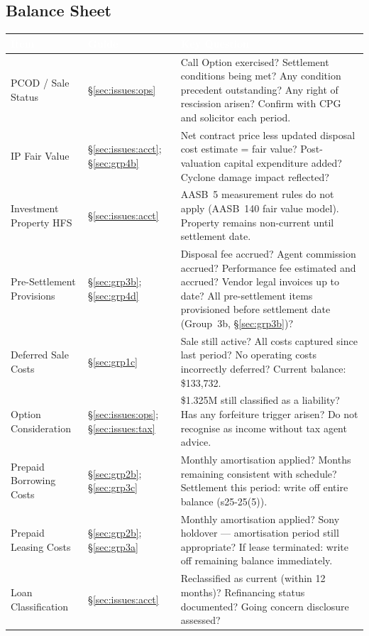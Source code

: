 \documentclass[10pt,a4paper]{article}
\begin{document}
\subsection{Balance Sheet}
{\small\sffamily
\begin{tabularx}{\textwidth}{@{} L{3.4cm} L{1.6cm} X @{}}
\textcolor{white}{\bfseries Item} & \textcolor{white}{\bfseries Guide} & \textcolor{white}{\bfseries Key Question} \\
\midrule
PCOD / Sale Status & \S\ref{sec:issues:ops} & Call Option exercised? Settlement conditions being met? Any condition precedent outstanding? Any right of rescission arisen? Confirm with CPG and solicitor each period. \\
IP Fair Value & \S\ref{sec:issues:acct}; \S\ref{sec:grp4b} & Net contract price less updated disposal cost estimate = fair value? Post-valuation capital expenditure added? Cyclone damage impact reflected? \\
Investment Property HFS & \S\ref{sec:issues:acct} & AASB~5 measurement rules do not apply (AASB~140 fair value model). Property remains non-current until settlement date. \\
Pre-Settlement Provisions & \S\ref{sec:grp3b}; \S\ref{sec:grp4d} & Disposal fee accrued? Agent commission accrued? Performance fee estimated and accrued? Vendor legal invoices up to date? All pre-settlement items provisioned before settlement date (Group~3b, \S\ref{sec:grp3b})? \\
Deferred Sale Costs & \S\ref{sec:grp1c} & Sale still active? All costs captured since last period? No operating costs incorrectly deferred? Current balance: \$133,732. \\
Option Consideration & \S\ref{sec:issues:ops}; \S\ref{sec:issues:tax} & \$1.325M still classified as a liability? Has any forfeiture trigger arisen? Do not recognise as income without tax agent advice. \\
Prepaid Borrowing Costs & \S\ref{sec:grp2b}; \S\ref{sec:grp3c} & Monthly amortisation applied? Months remaining consistent with schedule? Settlement this period: write off entire balance (s25-25(5)). \\
Prepaid Leasing Costs & \S\ref{sec:grp2b}; \S\ref{sec:grp3a} & Monthly amortisation applied? Sony holdover --- amortisation period still appropriate? If lease terminated: write off remaining balance immediately. \\
Loan Classification & \S\ref{sec:issues:acct} & Reclassified as current (within 12 months)? Refinancing status documented? Going concern disclosure assessed? \\

\end{tabularx}}
\end{document}
